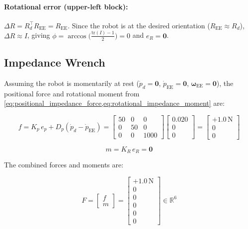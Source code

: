 \paragraph{Rotational error (upper-left block):}
\(\Delta R = R_d^\top R_{\mathrm{EE}} = R_{\mathrm{EE}}\).
Since the robot is at the desired orientation (\(R_{\mathrm{EE}}\approx R_d\)),
\(\Delta R\approx I\), giving
\(\phi = \arccos\!\bigl(\tfrac{\mathrm{tr}(I)-1}{2}\bigr) = 0\)
and $e_R = \mathbf{0}$.

\subsection{Impedance Wrench}

Assuming the robot is momentarily at rest
($\dot{p}_d=\mathbf{0}$, $\dot{p}_{\mathrm{EE}}=\mathbf{0}$, $\boldsymbol{\omega}_{\mathrm{EE}}=\mathbf{0}$),
the positional force and rotational moment from
\cref{eq:positional_impedance_force,eq:rotational_impedance_moment} are:

\begin{equation}
\label{eq:F_panda}
f = K_p\,e_p + D_p\left(\dot{p}_d-\dot{p}_{\mathrm{EE}}\right)
=
\begin{bmatrix}
50   & 0  & 0    \\
0    & 50 & 0    \\
0    & 0  & 1000
\end{bmatrix}
\begin{bmatrix}
0.020 \\ 0 \\ 0
\end{bmatrix}
=
\begin{bmatrix}
+1.0\,\mathrm{N} \\ 0 \\ 0
\end{bmatrix}
\end{equation}

\begin{equation}
m = K_R\,e_R = \mathbf{0}
\end{equation}

The combined forces and moments are:

\begin{equation}
F =
\begin{bmatrix}
f \\ m
\end{bmatrix}
=
\begin{bmatrix}
+1.0\,\mathrm{N} \\ 0 \\ 0 \\ 0 \\ 0 \\ 0
\end{bmatrix}
\in\mathbb{R}^6
\end{equation}

